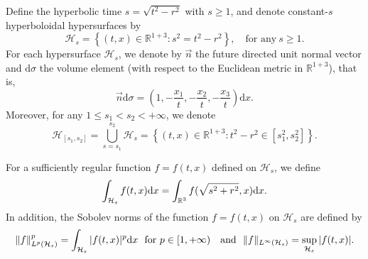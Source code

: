 \documentclass[a4paper,reqno]{amsart}
\theoremstyle{definition}
\numberwithin{equation}{section}
\def \R {{\mathbb{R} }}
\def \d {{\rm{d}}}
\begin{document}
\smallskip
Define the hyperbolic time $s=\sqrt{t^{2}-r^{2}}$ with $s\ge 1$, and denote constant-$s$ hyperboloidal hypersurfaces by
\begin{equation*}
    \mathcal{H}_{s}{=}\left\{(t,x)\in \mathbb{R}^{1+3}:s^{2}=t^{2}-r^{2}\right\}, \quad \mbox{for any}\ s\ge 1.
\end{equation*}
For each hypersurface $\mathcal{H}_s$, we denote by $\Vec{n}$ the future directed  unit normal vector and $\mathrm{d}\sigma$ {the} volume element (with respect to the Euclidean metric in $\mathbb{R}^{1+3}$),  that is, 
\begin{equation}\label{equ:normal}
\vec{n}\mathrm{d}\sigma =\left(1,-\frac{x_{1}}{t},-\frac{x_{2}}{t},-\frac{x_{3}}{t}\right)\mathrm{d}x.
\end{equation}
Moreover, for any $1\le s_{1}<s_{2}<+\infty$, we denote
\begin{equation*}
    \mathcal{H}_{[s_{1},s_{2}]}{=}\bigcup_{s=s_{1}}^{s_{2}}\mathcal{H}_{s}=\left\{(t,x)\in \mathbb{R}^{1+3}:t^{2}-r^{2}\in \left[s_{1}^{2},s_{2}^{2}\right]\right\}.
\end{equation*}

For a sufficiently regular function $f=f(t,x)$ defined on $\mathcal{H}_{s}$, we define
\begin{equation*}
    \int_{\mathcal{H}_{s}}f(t,x)\d x=\int_{\R^{3}}f(\sqrt{s^{2}+r^{2}},x)\d x.
\end{equation*}
In addition, the Sobolev norms of the function $f=f(t,x)$ on $\mathcal{H}_s$ are defined by 
\begin{equation*}
    \|f\|_{L^{p}(\mathcal{H}_{s})}^{p}=\int_{\mathcal{H}_{s}}|f(t,x)|^{p}\d x \ \  {\mbox{for}\ p\in [1,+\infty)}\quad\mbox{and}\ \ 
    \|f\|_{L^{\infty}(\mathcal{H}_{s})}=\sup_{\mathcal{H}_{s}}|f(t,x)|.
\end{equation*}
\end{document}
